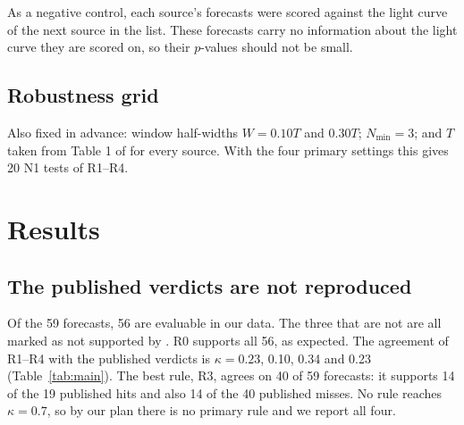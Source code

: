 \documentclass[twocolumn]{aastex631}
\begin{document}
As a negative control, each source's forecasts were scored against the light curve of the next source in the list. These forecasts carry no information about the light curve they are scored on, so their $p$-values should not be small.

\subsection{Robustness grid}

Also fixed in advance: window half-widths $W = 0.10T$ and $0.30T$; $N_{\min}=3$; and $T$ taken from Table 1 of \citet{penil26} for every source. With the four primary settings this gives 20 N1 tests of R1--R4.

\section{Results} \label{sec:results}

\subsection{The published verdicts are not reproduced}

Of the 59 forecasts, 56 are evaluable in our data. The three that are not are all marked as not supported by \citet{penil26}. R0 supports all 56, as expected. The agreement of R1--R4 with the published verdicts is $\kappa = 0.23$, 0.10, 0.34 and 0.23 (Table~\ref{tab:main}). The best rule, R3, agrees on 40 of 59 forecasts: it supports 14 of the 19 published hits and also 14 of the 40 published misses. No rule reaches $\kappa=0.7$, so by our plan there is no primary rule and we report all four.
\end{document}
